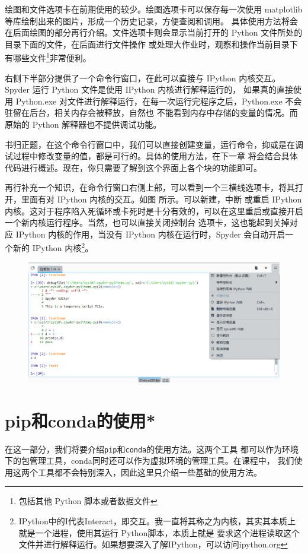 \documentclass[UTF8]{ctexart}
\begin{document}
绘图和文件选项卡在前期使用的较少。绘图选项卡可以保存每一次使用 matplotlib 等库绘制出来的图片，形成一个历史记录，方便查阅和调用。
具体使用方法将会在后面绘图的部分再行介绍。文件选项卡则会显示当前打开的 Python 文件所处的目录下面的文件，在后面进行文件操作
或处理大作业时，观察和操作当前目录下有哪些文件\footnote{包括其他 Python 脚本或者数据文件}非常便利。

右侧下半部分提供了一个命令行窗口，在此可以直接与 IPython 内核交互。Spyder 运行 Python 文件是使用 IPython 内核进行解释运行的，
如果真的直接使用 Python.exe 对文件进行解释运行，在每一次运行完程序之后，Python.exe 不会驻留在后台，相关内存会被释放，自然也
不能看到内存中存储的变量的情况。而原始的 Python 解释器也不提供调试功能。

书归正题，在这个命令行窗口中，我们可以直接创建变量，运行命令，抑或是在调试过程中修改变量的值，都是可行的。具体的使用方法，在下一章
将会结合具体代码进行概述。现在，你只需要了解到这个界面上各个块的功能即可。

再行补充一个知识，在命令行窗口右侧上部，可以看到一个三横线选项卡，将其打开，里面有对 IPython 内核的交互。如图 所示。可以新建，中断
或重启 IPython 内核。这对于程序陷入死循环或卡死时是十分有效的，可以在这里重启或直接开启一个新内核运行程序。当然，也可以直接关闭控制台
选项卡，这也能起到关掉对应 IPython 内核的作用，当没有 IPython 内核在运行时，Spyder 会自动开启一
个新的 IPython 内核\footnote{IPython中的I代表Interact，即交互。我一直将其称之为内核，其实其本质上就是一个进程，使用其运行 Python脚本，本质上就是
要求这个进程读取这个文件并进行解释运行。如果想要深入了解IPython，可以访问ipython.org}。
\begin{figure}[htbp]
    \centering
    \includegraphics[width=0.8\linewidth]{pic/ipython_interact.png}
\end{figure}

\section{pip和conda的使用*}
在这一部分，我们将要介绍\texttt{pip}和\texttt{conda}的使用方法。这两个工具
都可以作为环境下的包管理工具，conda同时还可以作为虚拟环境的管理工具。在课程中，
我们使用这两个工具都不会特别深入，因此这里只介绍一些基础的使用方法。
\end{document}
